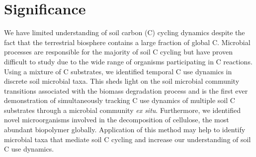 \section{Significance} 
We have limited understanding of soil carbon (C) cycling dynamics despite the fact that the terrestrial biosphere contains a large fraction of global C. Microbial processes are responsible for the majority of soil C cycling but have proven difficult to study due to the wide range of organisms participating in C reactions. Using a mixture of C substrates, we identified temporal C use dynamics in discrete soil microbial taxa. This sheds light on the soil microbial community transitions associated with the biomass degradation process and is the first ever demonstration of simultaneously tracking C use dynamics of multiple soil C substrates through a microbial community \textit{ex situ}. Furthermore, we identified novel microorganisms involved in the decomposition of cellulose, the most abundant biopolymer globally. Application of this method may help to identify microbial taxa that mediate soil C cycling and increase our understanding of soil C use dynamics. 